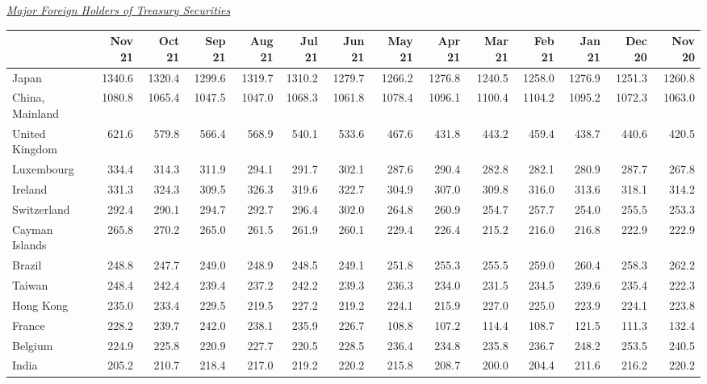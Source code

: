 \documentclass{article}
\begin{document}
    \href{https://ticdata.treasury.gov/Publish/mfh.txt}{\textit{Major Foreign Holders of Treasury Securities}}

    \begin{table}[H]
      \begin{tabular}{lrrrrrrrrrrrrr}
      \hline
      & Nov 21 & Oct 21 & Sep 21 & Aug 21 & Jul 21 & Jun 21 & May 21 & Apr 21 & Mar 21 & Feb 21 & Jan 21 & Dec 20 & Nov 20 \\
      \hline
      Japan & 1340.6 & 1320.4 & 1299.6 & 1319.7 & 1310.2 & 1279.7 & 1266.2 & 1276.8 & 1240.5 & 1258.0 & 1276.9 & 1251.3 & 1260.8 \\
      China, Mainland & 1080.8 & 1065.4 & 1047.5 & 1047.0 & 1068.3 & 1061.8 & 1078.4 & 1096.1 & 1100.4 & 1104.2 & 1095.2 & 1072.3 & 1063.0 \\
      United Kingdom & 621.6 & 579.8 & 566.4 & 568.9 & 540.1 & 533.6 & 467.6 & 431.8 & 443.2 & 459.4 & 438.7 & 440.6 & 420.5 \\
      Luxembourg & 334.4 & 314.3 & 311.9 & 294.1 & 291.7 & 302.1 & 287.6 & 290.4 & 282.8 & 282.1 & 280.9 & 287.7 & 267.8 \\
      Ireland & 331.3 & 324.3 & 309.5 & 326.3 & 319.6 & 322.7 & 304.9 & 307.0 & 309.8 & 316.0 & 313.6 & 318.1 & 314.2 \\
      Switzerland & 292.4 & 290.1 & 294.7 & 292.7 & 296.4 & 302.0 & 264.8 & 260.9 & 254.7 & 257.7 & 254.0 & 255.5 & 253.3 \\
      Cayman Islands & 265.8 & 270.2 & 265.0 & 261.5 & 261.9 & 260.1 & 229.4 & 226.4 & 215.2 & 216.0 & 216.8 & 222.9 & 222.9 \\
      Brazil & 248.8 & 247.7 & 249.0 & 248.9 & 248.5 & 249.1 & 251.8 & 255.3 & 255.5 & 259.0 & 260.4 & 258.3 & 262.2 \\
      Taiwan & 248.4 & 242.4 & 239.4 & 237.2 & 242.2 & 239.3 & 236.3 & 234.0 & 231.5 & 234.5 & 239.6 & 235.4 & 222.3 \\
      Hong Kong & 235.0 & 233.4 & 229.5 & 219.5 & 227.2 & 219.2 & 224.1 & 215.9 & 227.0 & 225.0 & 223.9 & 224.1 & 223.8 \\
      France & 228.2 & 239.7 & 242.0 & 238.1 & 235.9 & 226.7 & 108.8 & 107.2 & 114.4 & 108.7 & 121.5 & 111.3 & 132.4 \\
      Belgium & 224.9 & 225.8 & 220.9 & 227.7 & 220.5 & 228.5 & 236.4 & 234.8 & 235.8 & 236.7 & 248.2 & 253.5 & 240.5 \\
      India & 205.2 & 210.7 & 218.4 & 217.0 & 219.2 & 220.2 & 215.8 & 208.7 & 200.0 & 204.4 & 211.6 & 216.2 & 220.2 \\

\end{tabular}
\end{table}
\end{document}
